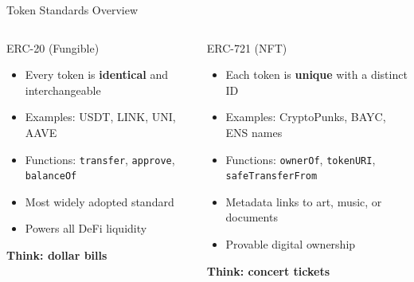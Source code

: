 \documentclass[8pt,aspectratio=169]{beamer}
\begin{document}
\begin{frame}{Token Standards Overview}
\begin{columns}[T]
\begin{block}{\textcolor{mlblue}{ERC-20 (Fungible)}}
\footnotesize
\begin{itemize}
  \item Every token is \textbf{identical} and interchangeable
  \item Examples: USDT, LINK, UNI, AAVE
  \item Functions: \texttt{transfer}, \texttt{approve}, \texttt{balanceOf}
  \item Most widely adopted standard
  \item Powers all DeFi liquidity
\end{itemize}
\vspace{1mm}
\centering
\textcolor{mlblue}{\textbf{Think: dollar bills}}
\end{block}

\begin{block}{\textcolor{mlgreen}{ERC-721 (NFT)}}
\footnotesize
\begin{itemize}
  \item Each token is \textbf{unique} with a distinct ID
  \item Examples: CryptoPunks, BAYC, ENS names
  \item Functions: \texttt{ownerOf}, \texttt{tokenURI}, \texttt{safeTransferFrom}
  \item Metadata links to art, music, or documents
  \item Provable digital ownership
\end{itemize}
\vspace{1mm}
\centering
\textcolor{mlgreen}{\textbf{Think: concert tickets}}
\end{block}


\end{columns}
\end{frame}
\end{document}
